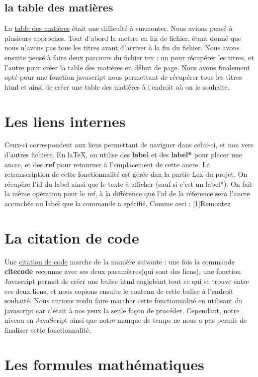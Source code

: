 \documentclass[10pt,a4paper]{report}
\begin{document}
\subsection{la table des matières}
La \underline{table des matières} était une difficulté à surmonter. Nous avions pensé à plusieurs approches. Tout d'abord la mettre en fin de fichier, étant donné que nous n'avons pas tous les titres avant d'arriver à la fin du fichier. Nous avons ensuite pensé à faire deux parcours du fichier tex : un pour récupérer les titres, et l'autre pour créer la table des matières en début de page. Nous avons finalement opté pour une fonction javascript nous permettant de récupérer tous les titres html et ainsi de créer une table des matières à l'endroit où on le souhaite.
\section{Les liens internes}
Ceux-ci correspondent aux liens permettant de naviguer dans celui-ci, et non vers d'autres fichiers. En laTeX, on utilise des {\bf label} et des {\bf label*} pour placer une ancre, et des {\bf ref} pour retourner à l'emplacement de cette ancre. La retranscription de cette fonctionnalité est gérée dan la partie Lex du projet. On récupère l'id du label ainsi que le texte à afficher (sauf si c'est un label*). On fait la même opération pour le ref, à la différence que l'id de la réference sera l'ancre accrochée au label que la commande a spécifié. Comme ceci :
\ref{1}{Remontez}

\section{La citation de code}
Une \underline{citation de code} marche de la manière suivante : une fois la commande {\bf citecode} reconnue avec ses deux paramètres(qui sont des liens), une fonction Javascript permet de créer une balise html englobant tout ce qui se trouve entre ces deux liens, et nous copions ensuite le contenu de cette balise à l'endroit souhaité. Nous aurions voulu faire marcher cette fonctionnalité en utilisant du javascript car c'était à nos yeux la seule façon de procéder. Cependant, notre niveau en JavaScript ainsi que notre manque de temps ne nous a pas permis de finaliser cette fonctionnalité.

\section{Les formules mathématiques}
\end{document}
